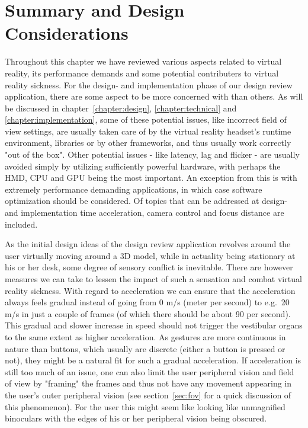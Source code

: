 \section{Summary and Design Considerations}
Throughout this chapter we have reviewed various aspects related to virtual reality, its performance demands and some potential contributers to virtual reality sickness. 
For the design- and implementation phase of our design review application, there are some aspect to be more concerned with than others. As will be discussed in chapter~\ref{chapter:design}, 
\ref{chapter:technical} and \ref{chapter:implementation}, some of these potential issues, like incorrect field of view settings, are usually taken care of by the 
virtual reality headset's runtime environment, libraries or by other frameworks, and thus usually work correctly "out of the box". 
Other potential issues - like latency, lag and flicker - are usually avoided simply by utilizing sufficiently powerful hardware, with perhaps the HMD, CPU and GPU 
being the most important. An exception from this is with extremely performance demanding applications, in which case software optimization should be considered.
Of topics that can be addressed at design- and implementation time acceleration, camera control and focus distance are included.  

As the initial design ideas of the design review application revolves around the user virtually moving around a 3D model, while in actuality being stationary at his or her
desk, some degree of sensory conflict is inevitable. There are however measures we can take to lessen the impact of such a sensation and combat virtual reality sickness.
With regard to acceleration we can ensure that the acceleration always feels gradual instead of going from 0 m/s (meter per second) to e.g.~20 m/s in just a couple of frames 
(of which there should be about 90 per second). This gradual and slower increase in speed should not trigger the vestibular organs to the same extent as higher acceleration.
As gestures are more continuous in nature than buttons, which usually are discrete (either a button is pressed or not), they might be a natural fit for such a gradual acceleration. 
If acceleration is still too much of an issue, one can also limit the user peripheral vision and field of view by "framing" the frames
and thus not have any movement appearing in the user's outer peripheral vision (see section~\vref{sec:fov} for a quick discussion of this phenomenon).
For the user this might seem like looking like unmagnified binoculars with the edges of his or her peripheral vision being obscured.  

